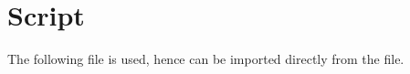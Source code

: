 \chapter{Script}\label{appB}

The following file is used, hence can be imported directly from the file.



